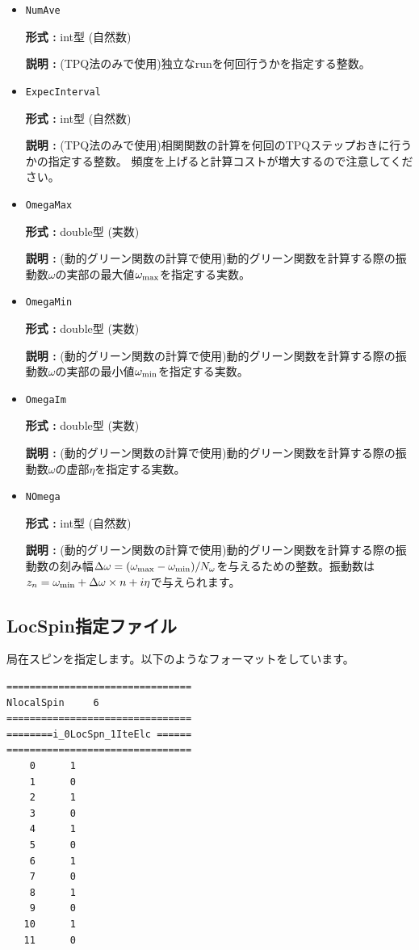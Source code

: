 \begin{itemize}
\item \verb|NumAve|

{\bf 形式 :} int型 (自然数)

{\bf 説明 :} (TPQ法のみで使用)独立なrunを何回行うかを指定する整数。

\item \verb|ExpecInterval|

{\bf 形式 :} int型 (自然数)

{\bf 説明 :} (TPQ法のみで使用)相関関数の計算を何回のTPQステップおきに行うかの指定する整数。
頻度を上げると計算コストが増大するので注意してください。

\item \verb|OmegaMax|

{\bf 形式 :} double型 (実数)

{\bf 説明 :} {(動的グリーン関数の計算で使用)動的グリーン関数を計算する際の振動数$\omega$の実部の最大値$\omega_{\rm max}$を指定する実数。}

\item \verb|OmegaMin|

{\bf 形式 :} double型 (実数)

{\bf 説明 :} {(動的グリーン関数の計算で使用)動的グリーン関数を計算する際の振動数$\omega$の実部の最小値$\omega_{\rm min}$を指定する実数。}

\item \verb|OmegaIm|

{\bf 形式 :} double型 (実数)

{\bf 説明 :} {(動的グリーン関数の計算で使用)動的グリーン関数を計算する際の振動数$\omega$の虚部$\eta$を指定する実数。}
 
\item \verb|NOmega|

{\bf 形式 :} int型 (自然数)

{\bf 説明 :} {(動的グリーン関数の計算で使用)動的グリーン関数を計算する際の振動数の刻み幅$\Delta \omega = (\omega_{\rm max}-\omega_{\rm min} )/N_{\omega}$を与えるための整数。振動数は$z_n=\omega_{\rm min} + \Delta \omega \times n+ i\eta$で与えられます。} 
 \end{itemize}


\newpage
\subsection{LocSpin指定ファイル}
\label{Subsec:locspn}
局在スピンを指定します。以下のようなフォーマットをしています。\\
\begin{minipage}{10cm}
\begin{screen}
\begin{verbatim}
================================ 
NlocalSpin     6  
================================ 
========i_0LocSpn_1IteElc ====== 
================================ 
    0      1
    1      0
    2      1
    3      0
    4      1
    5      0
    6      1
    7      0
    8      1
    9      0
   10      1
   11      0
\end{verbatim}
\end{screen}
\end{minipage}



